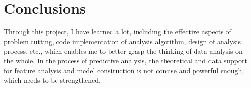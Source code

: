 \section{Conclusions}\label{sec-preliminaries}

Through this project, I have learned a lot, including the effective aspects of problem cutting, code implementation of analysis algorithm, design of analysis process, etc., which enables me to better grasp the thinking of data analysis on the whole.
In the process of predictive analysis, the theoretical and data support for feature analysis and model construction is not concise and powerful enough, which needs to be strengthened.
